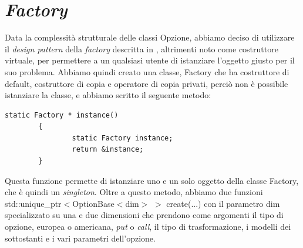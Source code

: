 \documentclass[a4paper,10pt]{report}
\theoremstyle{plain}
\theoremstyle{definition}
\theoremstyle{remark}
\begin{document}
\section{\emph{Factory}}
Data la complessit\`a strutturale delle classi Opzione, abbiamo deciso di utilizzare il \emph{design pattern} della \emph{factory} descritta in \cite{gamma1994design}, altrimenti noto come costruttore virtuale, per permettere a un qualsiasi utente di istanziare l'oggetto giusto per il suo problema. Abbiamo quindi creato una classe, \textsf{Factory} che ha costruttore di default, costruttore di copia e operatore di copia privati, perci\`o non \`e possibile istanziare la classe, e abbiamo scritto il seguente metodo:
\begin{lstlisting}
static Factory * instance()
        {
                static Factory instance;
                return &instance;
        }
\end{lstlisting}
Questa funzione permette di istanziare uno e un solo oggetto della classe \textsf{Factory}, che \`e quindi un \emph{singleton}. Oltre a questo metodo, abbiamo due funzioni \textsf{std::unique\_ptr$<$OptionBase$<$dim$>$ $>$ create(...)} con il parametro \textsf{dim} specializzato su una e due dimensioni che prendono come argomenti il tipo di opzione, europea o americana, \emph{put} o \emph{call}, il tipo di trasformazione, i modelli dei sottostanti e i vari parametri dell'opzione.
\end{document}

